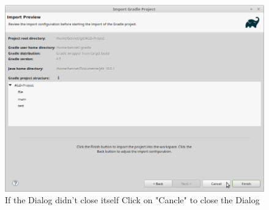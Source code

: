 \begin{figure}[H]
	\includegraphics[width=\textwidth]{setup-parts/pictures/eclipse-import-8.png}
	\caption{If the Dialog didn't close itself Click on "Cancle" to close the Dialog}
\end{figure}
